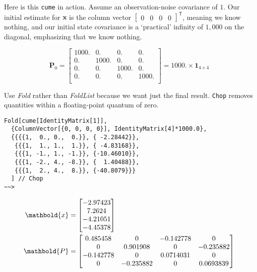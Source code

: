 \documentclass[10pt,oneside,x11names]{article}
\begin{document}
\begin{enumerate}
Here is this \texttt{cume} in action. Assume an observation-noise covariance of \(1\). Our
initial estimate for \(\mathbold{x}\) is the column vector
\(\begin{bmatrix}0& 0& 0& 0\end{bmatrix}^{\mathsf{T}}\),
meaning we
know nothing, and our initial state covariance is a `practical' infinity of
\(1,000\) on the diagonal, emphasizing that we know nothing.

\begin{equation}
\mathbold{P}_0 =
\begin{bmatrix}
 1000. & 0. & 0. & 0. \\
 0. & 1000. & 0. & 0. \\
 0. & 0. & 1000. & 0. \\
 0. & 0. & 0. & 1000. \\
\end{bmatrix}
=1000. \times \mathbold{1}_{4\times{4}}
\end{equation}

Use \emph{Fold} rather than \emph{FoldList} because we want just the final result. \texttt{Chop}
removes quantities within a floating-point quantum of zero.

\begin{verbatim}
Fold[cume[IdentityMatrix[1]],
  {ColumnVector[{0, 0, 0, 0}], IdentityMatrix[4]*1000.0},
  {{{{1,  0., 0.,  0.}}, { -2.28442}},
   {{{1,  1., 1.,  1.}}, { -4.83168}},
   {{{1, -1., 1., -1.}}, {-10.46010}},
   {{{1, -2., 4., -8.}}, {  1.40488}},
   {{{1,  2., 4.,  8.}}, {-40.8079}}}
  ] // Chop
~~>
\end{verbatim}

\begin{align}
\label{eqn:kalman-filter-results}
\mathbold{x} &=
\begin{bmatrix}
 -2.97423 \\
  7.2624  \\
 -4.21051 \\
 -4.45378 \\
\end{bmatrix}
\\
\notag
\mathbold{P} &=
\begin{bmatrix}
 0.485458 & 0 & -0.142778 & 0 \\
 0 & 0.901908 & 0 & -0.235882 \\
 -0.142778 & 0 & 0.0714031 & 0 \\
 0 & -0.235882 & 0 & 0.0693839 \\
\end{bmatrix}
\end{align}


\end{enumerate}
\end{document}
